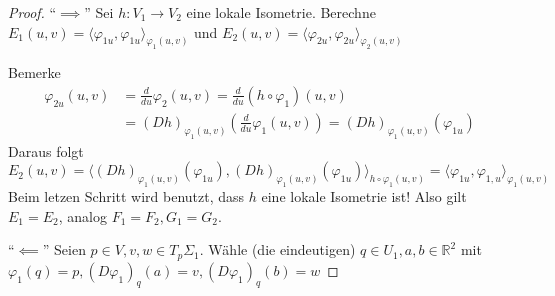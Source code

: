\documentclass[../main.tex]{subfiles}
\begin{document}
\begin{proof}
    ``$\implies$'' Sei $h:V_1 \to V_2$ eine lokale Isometrie.
    Berechne $E_1(u,v)=\langle \varphi_{1u}, \varphi_{1u} \rangle _{\varphi_1(u,v)}$ und
    $E_2(u,v)=\langle \varphi_{2u}, \varphi_{2u} \rangle _{\varphi_2(u,v)}$

    Bemerke
    \begin{align*}
        \varphi_{2u}(u,v)&=\frac{d}{du}\varphi_2(u,v)=\frac{d}{du}(h \circ \varphi_1)(u,v) \\
        &=(Dh)_{\varphi_1(u,v)}\left(\frac{d}{du}\varphi_1(u,v)\right)=(Dh)_{\varphi_1(u,v)}(\varphi_{1u})
    \end{align*}
    Daraus folgt
    $$E_2(u,v)=\langle (Dh)_{\varphi_1(u,v)}(\varphi_{1u}), (Dh)_{\varphi_1(u,v)}(\varphi_{1u}) \rangle _{h \circ \varphi_1(u,v)}= \langle \varphi_{1u}, \varphi_{1,u}\rangle _{\varphi_1(u,v)}$$
    Beim letzen Schritt wird benutzt, dass $h$ eine lokale Isometrie ist! Also gilt $E_1=E_2$, analog $F_1=F_2, G_1=G_2$.

    ``$\impliedby$'' Seien $p \in V, v,w \in T_p\Sigma_1$.
    Wähle (die eindeutigen) $q \in U_1, a,b \in \mathbb{R}^2$ mit 
    $\varphi_1 (q)=p, (D\varphi_1)_q(a)=v, (D\varphi_1)_q(b)=w$


\end{proof}
\end{document}
